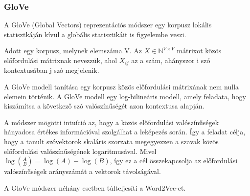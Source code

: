 \subsubsection{GloVe}
A GloVe (Global Vectors) reprezentációs módszer egy korpusz lokális statisztkáján kívül a globális statisztikáit is figyelembe veszi. 

\begin{definition}
	Adott egy korpusz, melynek elemszáma V. Az $X \in \mathbb{N}^{V \times V}$ mátrixot közös előfordulási mátrixnak nevezzük, ahol $X_{ij}$ az a  szám, ahányszor i szó kontextusában j szó megjelenik.  
\end{definition}

A GloVe modell tanítása egy korpusz közös előfordulási mátrixának nem nulla elemein történik. A GloVe modell egy log-bilineáris modell, amely feladata, hogy kiszámítsa a következő szó valószínűségét azon kontextusa alapján.

A módszer mögötti intuíció az, hogy a közös előfordulási valószínűségek hányadosa értékes információval szolgálhat a leképezés során. Így a feladat célja, hogy a tanult szóvektorok skaláris szorzata megegyezzen a szavak közös előfordulási valószínűségének logaritmusával. Mivel $\log \left( \frac{A}{B} \right) = \log \left( A \right) - \log \left( B \right)$, így ez a cél összekapcsolja az előfordulási valószínűségek arányszámát a vektorok távolságával.

\begin{note}
	A GloVe módszer néhány esetben túlteljesíti a Word2Vec-et.
\end{note}